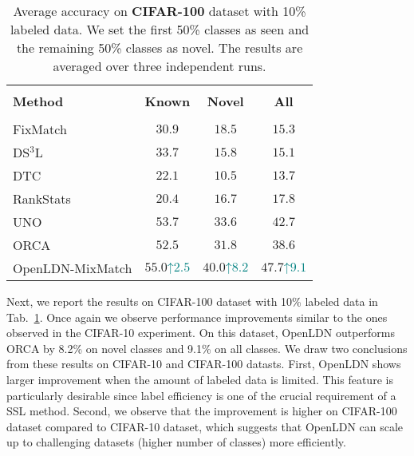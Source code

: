 \documentclass[runningheads]{eccv2022submission}
\begin{document}
\begin{table}[h]
\begin{center}\setlength{\tabcolsep}{2pt}

\begin{tabular}{lccc}
\hline

\hline

\hline\\[-3mm]
\textbf{Method} & \textbf{Known} & \textbf{Novel} & \textbf{All}\\
[-3mm]
\\
 \hline

\hline

\hline
FixMatch\cite{sohn2020fixmatch} & $30.9$ & $18.5$ & $15.3$\\
DS$^{3}$L\cite{guo2020safe} & $33.7$ & $15.8$ & $15.1$\\
DTC\cite{han2019learning} & $22.1$ & $10.5$ & $13.7$\\
RankStats\cite{Han2020Automatically} & $20.4$ & $16.7$ & $17.8$\\
UNO\cite{fini2021unified} & $53.7$ & $33.6$ & $42.7$\\
ORCA\cite{cao2022openworld} & $52.5$ & $31.8$ & $38.6$\\
\rowcolor[gray]{.95} {OpenLDN-MixMatch} & $\mathbf{55.0}${\tiny{\textcolor{teal}{$\mathord{\uparrow}2.5$}}} & $\mathbf{40.0}${\tiny{\textcolor{teal}{$\mathord{\uparrow}8.2$}}} & $\mathbf{47.7}${\tiny{\textcolor{teal}{$\mathord{\uparrow}9.1$}}}\\ 
\hline 

\hline

\hline
\end{tabular}
\end{center}
\small
\caption{Average accuracy on \textbf{CIFAR-100} dataset with 10\% labeled data. We set the first 50\% classes as seen and the remaining 50\% classes as novel. The results are averaged over three independent runs.}
\label{tab:cifar100}
\end{table}


Next, we report the results on CIFAR-100 dataset with 10\% labeled data in Tab.~\ref{tab:cifar100}. Once again we observe performance improvements similar to the ones observed in the CIFAR-10 experiment. On this dataset, OpenLDN outperforms ORCA\cite{cao2022openworld} by 8.2\% on novel classes and 9.1\% on all classes. We draw two conclusions from these results on CIFAR-10 and CIFAR-100 datasts. First, OpenLDN shows larger improvement when the amount of labeled data is limited. This feature is particularly desirable since label efficiency is one of the crucial requirement of a SSL method. Second, we observe that the improvement is higher on CIFAR-100 dataset compared to CIFAR-10 dataset, which suggests that OpenLDN can scale up to challenging datasets (higher number of classes) more efficiently.      
\end{document}
